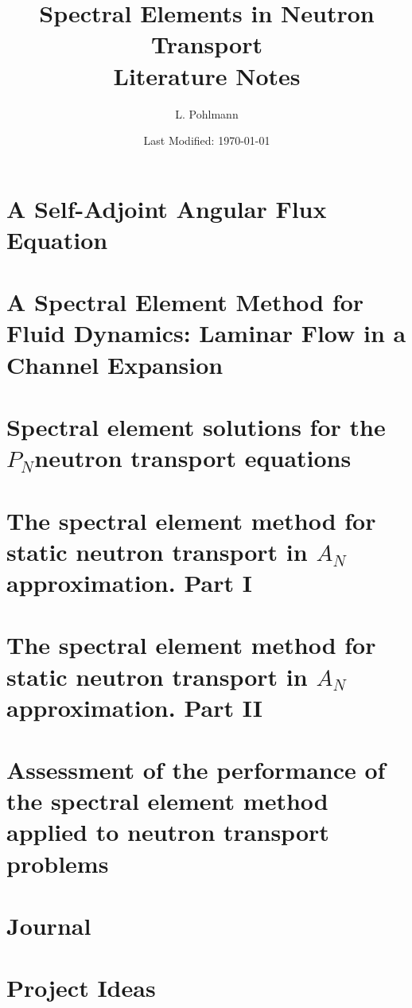 \documentclass[11pt]{article}
\title{\textbf{Spectral Elements in Neutron Transport\\Literature Notes}}
\author{L. Pohlmann}
\date{Last Modified: \today}
\newcommand{\Pn}{$P_N$}
\newcommand{\An}{$A_N$}
\begin{document}
\maketitle
\tableofcontents
\printglossary[type=\acronymtype]

\section{A Self-Adjoint Angular Flux Equation~\cite{morelSelfAdjointAngularFlux1999}}


\section{A Spectral Element Method for Fluid Dynamics: Laminar Flow in a Channel Expansion~\cite{pateraSpectralElementMethod1984}}


\section{Spectral element solutions for the \Pn neutron transport equations~\cite{mundSpectralElementSolutions2011}}


\section{The spectral element method for static neutron transport in \An approximation. Part I~\cite{BARBARINO2013372}}


\section{The spectral element method for static neutron transport in \An approximation. Part II~\cite{BARBARINO2015108}}


\section{Assessment of the performance of the spectral element method applied to neutron transport problems~\cite{BARBARINO2014190}}


\section{Journal}


\section{Project Ideas}
\end{document}
